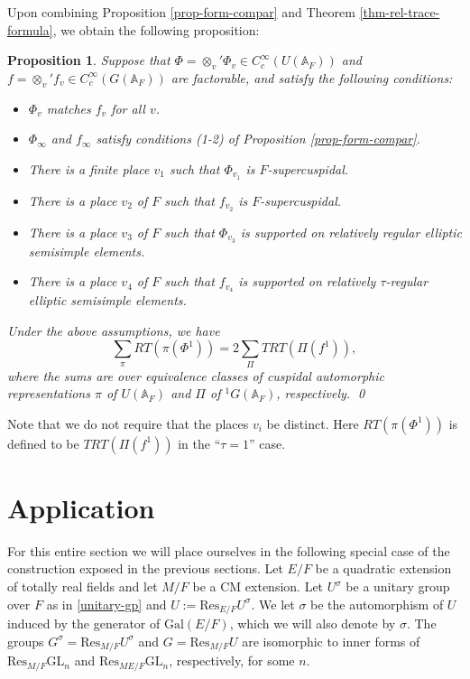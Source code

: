 \documentclass[12pt]{amsart}
\newtheorem{prop}[thm]{Proposition}
\theoremstyle{remark}
\numberwithin{equation}{section}
\newcommand{\A}{\mathbb{A}}
\newcommand{\GL}{\mathrm{GL}}
\newcommand{\Gal}{\mathrm{Gal}}
\theoremstyle{definition}
\numberwithin{equation}{subsection}
\newcommand{\Res}{\mathrm{Res}}
\begin{document}
Upon combining Proposition \ref{prop-form-compar} and Theorem \ref{thm-rel-trace-formula}, we obtain the following proposition:

\begin{prop} \label{prop-spect-compar}  Suppose that $\Phi=\otimes_v'\Phi_v \in C_c^{\infty}(U(\A_F))$
and $f=\otimes_v' f_v\in C_c^{\infty}(G(\A_F))$ are factorable, and satisfy the following conditions:
\begin{itemize}
\item $\Phi_v$ matches $f_v$ for all $v$.
\item $\Phi_{\infty}$ and $f_{\infty}$ satisfy conditions (1-2) of Proposition \ref{prop-form-compar}.
\item There is a finite place $v_1$ such that $\Phi_{v_1}$ is $F$-supercuspidal.
\item There is a place $v_2$ of $F$ such that $f_{v_2}$ is $F$-supercuspidal.
\item There is a place $v_3$ of $F$ such that  $\Phi_{v_3}$ is supported on relatively regular elliptic semisimple elements.
\item There is a place $v_4$ of $F$ such that $f_{v_4}$ is supported on relatively $\tau$-regular elliptic semisimple elements.
\end{itemize}
Under the above assumptions, we have
$$
\sum_{\pi} RT(\pi(\Phi^1))=2\sum_{\Pi} TRT(\Pi(f^1)),
$$
where the sums are over equivalence classes of cuspidal automorphic representations $\pi$ of $U(\A_F)$ and $\Pi$ of ${}^1G(\A_F)$, respectively.  \qed
\end{prop}
\noindent
Note that we do not require that the places $v_i$ be distinct.  Here $RT(\pi(\Phi^1))$ is defined to be $TRT(\Pi(f^1))$ in the ``$\tau=1$'' case.


\section{Application}

\label{ssec-apps}

 For this entire section we will place ourselves in the following special case of the construction exposed in the previous sections.
 Let $E/F$ be a quadratic extension of totally real fields and let $M/F$ be a CM extension.
Let $U^{\sigma}$ be a unitary group over $F$ as in \eqref{unitary-gp} and $U:=\mathrm{Res}_{E/F}U^{\sigma}$.  We let $\sigma$ be the automorphism of $U$ induced by the generator of $\Gal(E/F)$, which we will also denote by $\sigma$.  The groups $G^{\sigma}=\mathrm{Res}_{M/F}U^{\sigma}$ and $G=\mathrm{Res}_{M/F}U$ are isomorphic to inner forms of $\Res_{M/F}\GL_n$ and $\Res_{ME/F}\GL_n$, respectively, for some $n$.
\end{document}
